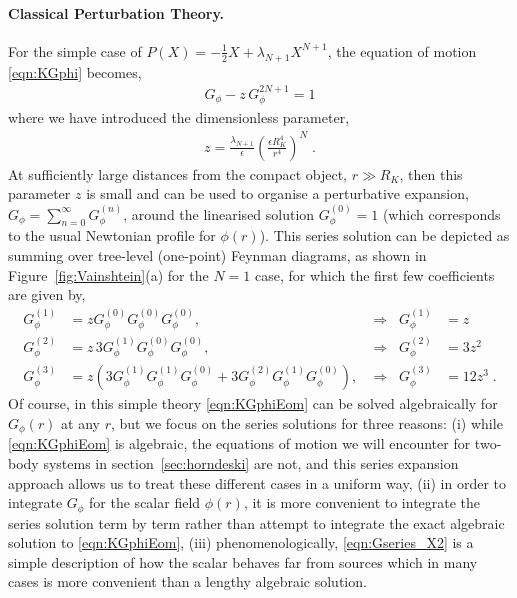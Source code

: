 \documentclass[11pt]{article}
\begin{document}
\paragraph{Classical Perturbation Theory.}
For the simple case of $P(X) = -\tfrac{1}{2} X + \lambda_{N+1} X^{N+1}$, the equation of motion \eqref{eqn:KGphi} becomes,
\begin{align}
 G_\phi - z \, G_{\phi}^{2N+1}   =   1 
\label{eqn:KGphiEom}
\end{align} 
where we have introduced the dimensionless parameter,
\begin{align}
z =  \frac{ \lambda_{N+1} }{\epsilon} \left( \frac{\epsilon R_K^4}{r^4} \right)^N \; .
\label{eqn:z_PX}
\end{align}
At sufficiently large distances from the compact object, $r \gg R_K$, then this parameter $z$ is small and can be used to organise a perturbative expansion,  $G_\phi = \sum_{n=0}^\infty G_\phi^{(n)}$, around the linearised solution $G_\phi^{(0)} = 1$ (which corresponds to the usual Newtonian profile for $\phi (r)$). This series solution can be depicted as summing over tree-level (one-point) Feynman diagrams, as shown in Figure~\ref{fig:Vainshtein}(a) for the $N=1$ case, for which the first few coefficients are given by,
\begin{align}
G_\phi^{(1)} &= z  G_\phi^{(0)} G_\phi^{(0)} G_\phi^{(0)} 
,   &\Rightarrow \;\; G_\phi^{(1)} &= z   \nonumber \\
%
 G_\phi^{(2)} &= z\,  3 G_\phi^{(1)} G_\phi^{(0)}G_\phi^{(0)}  
 ,   &\Rightarrow \;\; G_\phi^{(2)} &= 3 z^2   \nonumber \\ 
 G_\phi^{(3)} &=z \left( 3 G_\phi^{(1)} G_\phi^{(1)}G_\phi^{(0)} + 3 G_\phi^{(2)} G_\phi^{(1)}G_\phi^{(0)} \right) 
 ,   &\Rightarrow \;\; G_\phi^{(3)} &=  12  z^3  \; .  \label{eqn:Gseries_X2} 
\end{align}
Of course, in this simple theory \eqref{eqn:KGphiEom} can be solved algebraically for $G_\phi (r)$ at any $r$, but we focus on the series solutions for three reasons: (i) while \eqref{eqn:KGphiEom} is algebraic, the equations of motion we will encounter for two-body systems in section~\ref{sec:horndeski} are not, and this series expansion approach allows us to treat these different cases in a uniform way, (ii) in order to integrate $G_\phi$ for the scalar field $\phi (r)$, it is more convenient to integrate the series solution term by term rather than attempt to integrate the exact algebraic solution to \eqref{eqn:KGphiEom}, (iii) phenomenologically, \eqref{eqn:Gseries_X2} is a simple description of how the scalar behaves far from sources which in many cases is more convenient than a lengthy algebraic solution.
\end{document}
